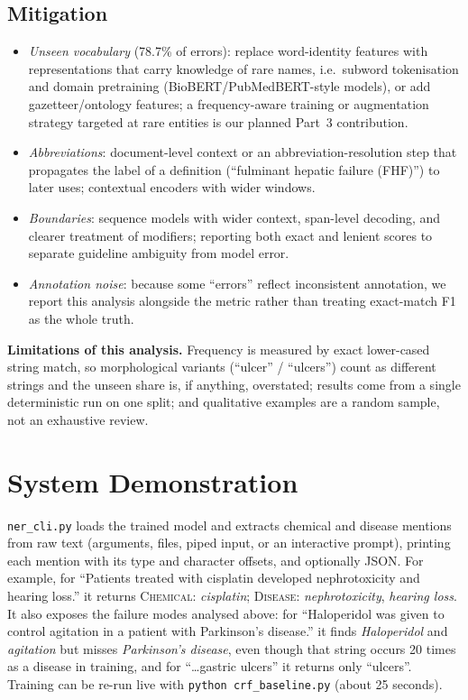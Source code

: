 \documentclass[10pt,a4paper]{article}
\newcommand{\chem}{\textsc{Chemical}}
\newcommand{\dis}{\textsc{Disease}}
\begin{document}



\subsection{Mitigation}
\begin{itemize}
\item \emph{Unseen vocabulary} (78.7\% of errors): replace word-identity features with representations that carry knowledge of rare names, i.e.\ subword tokenisation and domain pretraining (BioBERT/PubMedBERT-style models), or add gazetteer/ontology features;
a frequency-aware training or augmentation strategy targeted at rare entities is our planned Part~3 contribution.
\item \emph{Abbreviations}: document-level context or an abbreviation-resolution step that propagates the label of a definition (``fulminant hepatic failure (FHF)'') to later uses; contextual encoders with wider windows.
\item \emph{Boundaries}: sequence models with wider context, span-level decoding, and clearer treatment of modifiers; reporting both exact and lenient scores to separate guideline ambiguity from model error.
\item \emph{Annotation noise}: because some ``errors'' reflect inconsistent annotation, we report this analysis alongside the metric rather than treating exact-match F1 as the whole truth.
\end{itemize}

\textbf{Limitations of this analysis.} Frequency is measured by exact lower-cased string match, so morphological variants (``ulcer'' / ``ulcers'') count as different strings and the unseen share is, if anything, overstated;
results come from a single deterministic run on one split; and qualitative examples are a random sample, not an exhaustive review.

\section{System Demonstration}
\texttt{ner\_cli.py} loads the trained model and extracts chemical and disease mentions from raw text (arguments, files, piped input, or an interactive prompt), printing each mention with its type and character offsets,
and optionally JSON. For example, for ``Patients treated with cisplatin developed nephrotoxicity and hearing loss.'' it returns \chem{}: \emph{cisplatin}; \dis{}: \emph{nephrotoxicity}, \emph{hearing loss}.
It also exposes the failure modes analysed above: for ``Haloperidol was given to control agitation in a patient with Parkinson's disease.'' it finds \emph{Haloperidol} and \emph{agitation} but misses \emph{Parkinson's disease},
even though that string occurs 20 times as a disease in training, and for ``\ldots gastric ulcers'' it returns only ``ulcers''. Training can be re-run live with \texttt{python crf\_baseline.py} (about 25 seconds).
\end{document}
